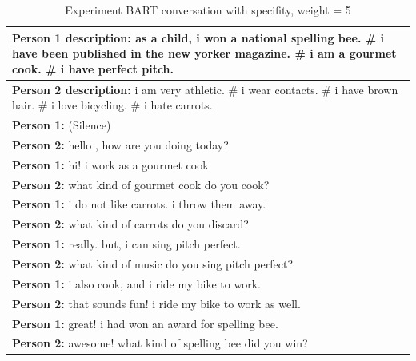 \begin{table}[ht]
\centering
 \begin{tabular}{|p{14cm}|} 
 \hline\hline
 \textbf{Person 1 description:} as a child, i won a national spelling bee. \# i have been published in the new yorker magazine. \# i am a gourmet cook. \# i have perfect pitch. \\
 \hline
 \textbf{Person 2 description:} i am very athletic. \# i wear contacts. \# i have brown hair. \# i love bicycling. \# i hate carrots. \\
 \hline\hline
 \textbf{Person 1:} (Silence) \\
 \textbf{Person 2:} hello , how are you doing today? \\ 
 \textbf{Person 1:} hi! i work as a gourmet cook \\
 \textbf{Person 2:} what kind of gourmet cook do you cook?\\
 \textbf{Person 1:} i do not like carrots. i throw them away. \\
 \textbf{Person 2:} what kind of carrots do you discard? \\
 \textbf{Person 1:} really. but, i can sing pitch perfect. \\
 \textbf{Person 2:} what kind of music do you sing pitch perfect? \\
 \textbf{Person 1:} i also cook, and i ride my bike to work. \\
 \textbf{Person 2:} that sounds fun! i ride my bike to work as well. \\
 \textbf{Person 1:} great! i had won an award for spelling bee. \\
 \textbf{Person 2:} awesome! what kind of spelling bee did you win? \\
 \hline\hline
 \end{tabular}
 \caption{Experiment BART conversation with specifity, weight = 5}
\label{tab:bart_conversation_idf5_ap}
\end{table}

